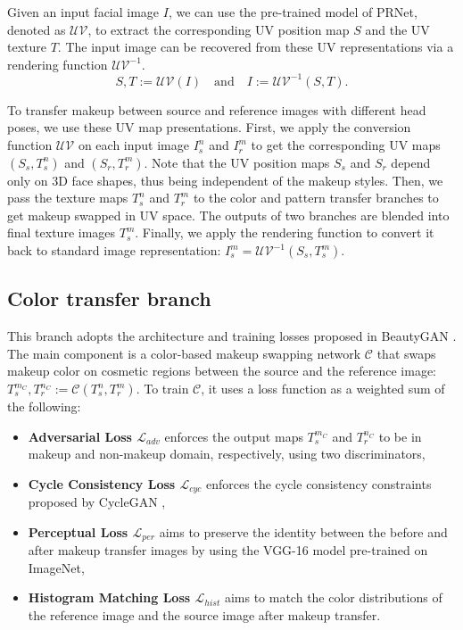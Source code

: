 \documentclass[final]{cvpr}
\begin{document}
Given an input facial image $I$, we can use the pre-trained model of PRNet, denoted as $\mathcal{UV}$, to extract the corresponding UV position map $S$ and the UV texture $T$. The input image can be recovered from these UV representations via a rendering function $\mathcal{UV}^{-1}$.
\begin{equation}
    S, T := \mathcal{U}\mathcal{V}(I) \quad \textrm{and} \quad I := \mathcal{UV}^{-1}(S, T).
\end{equation}





To transfer makeup between source and reference images with different head poses, we use these UV map presentations. First, we apply the conversion function $\mathcal{U}\mathcal{V}$ on each input image $I_{s}^{n}$ and $I_{r}^{m}$ to get the corresponding UV maps $(S_{s}, T_{s}^{n})$ and $(S_{r}, T_{r}^{m})$. Note that the UV position maps $S_{s}$ and $S_{r}$ depend only on 3D face shapes, thus being independent of the makeup styles. Then, we pass the texture maps $T_{s}^{n}$ and $T_{r}^{m}$ to the color and pattern transfer branches to get makeup swapped in UV space. The outputs of two branches are blended into final texture images $T_{s}^{m}$. Finally, we apply the rendering function to convert it back to standard image representation:
$I_{s}^{m} = \mathcal{UV}^{-1}(S_{s}, T_{s}^{m})$.

\subsection{Color transfer branch}
\label{sec:color_branch}
\vspace{-2mm}
This branch adopts the architecture and training losses proposed in BeautyGAN \cite{beautygan}. The main component is a color-based makeup swapping network $\mathcal{C}$ that swaps makeup color on cosmetic regions between the source and the reference image: $T_{s}^{m_C}, T_{r}^{n_C} :=\mathcal{C}(T_{s}^{n}, T_{r}^{m})$. To train $\mathcal{C}$, it uses a loss function as a weighted sum of the following: \begin{itemize} \denselist 
\item \textbf{Adversarial Loss $\mathcal{L}_{adv}$} enforces the output maps $T_{s}^{m_C}$ and $T_{r}^{n_C}$ to be in makeup and non-makeup domain, respectively, using two discriminators,
\item \textbf{Cycle Consistency Loss $\mathcal{L}_{cyc}$} enforces the cycle consistency constraints proposed by CycleGAN \cite{CycleGAN2017},
\item \textbf{Perceptual Loss $\mathcal{L}_{per}$} aims to preserve the identity between the before and after makeup transfer images by using the VGG-16 model pre-trained on ImageNet,
\item \textbf{Histogram Matching Loss $\mathcal{L}_{hist}$} aims to match the color distributions of the reference image and the source image after makeup transfer.
\end{itemize}
\end{document}
